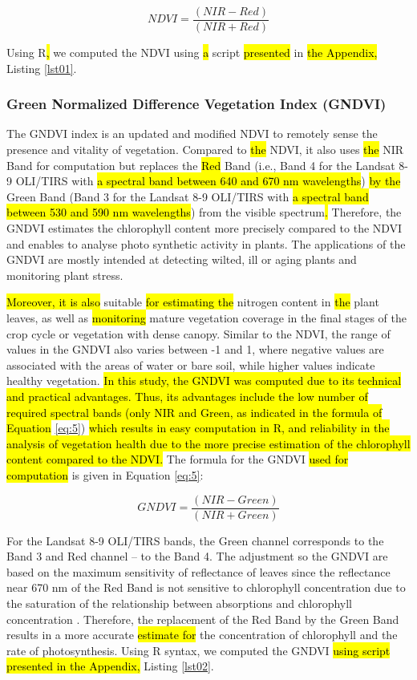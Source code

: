 \documentclass[jimaging,article,submit,pdftex,moreauthors]{Definitions/mdpi}
\begin{document}
\begin{equation}\label{eq:1}
NDVI=\dfrac{(NIR-Red)}{(NIR+Red)}
\end{equation}

Using R\hl{, }we computed the NDVI using \hl{a }script \hl{presented} in \hl{the Appendix, }Listing \ref{lst01}. 

\subsubsection{Green Normalized Difference Vegetation Index (GNDVI)}

The GNDVI index is an updated and modified NDVI to remotely sense the presence and vitality of vegetation. Compared to \hl{the }NDVI, it also uses \hl{the }NIR Band for computation but replaces the \hl{Red} Band (i.e., Band 4 for the Landsat 8-9 OLI/TIRS with \hl{a spectral band between 640 and 670 nm wavelengths}) \hl{by the }Green Band (Band 3 for the Landsat 8-9 OLI/TIRS with \hl{a spectral band between 530 and 590 nm wavelengths}) from the visible spectrum\hl{.} Therefore, the GNDVI estimates the chlorophyll content more precisely compared to the NDVI and enables to analyse photo synthetic activity in plants. The applications of the GNDVI are mostly intended at detecting wilted, ill or aging plants and monitoring plant stress. 

\hl{Moreover, it is also }suitable \hl{for estimating the }nitrogen content in \hl{the }plant leaves, as well as\hl{ monitoring} mature vegetation coverage in the final stages of the crop cycle\hl{ }or vegetation with dense canopy. Similar to the NDVI, the range of values in the GNDVI also varies between -1 and 1, where negative values are associated with the areas of water or bare soil, while higher values indicate healthy vegetation. \hl{In this study, the GNDVI was computed due to its technical and practical advantages. Thus, its advantages include the low number of required spectral bands (only NIR and Green, as indicated in the formula of Equation} \ref{eq:5}) \hl{which results in easy computation in R, and reliability in the analysis of vegetation health due to the more precise estimation of the chlorophyll content compared to the NDVI. }The formula for the GNDVI \hl{used for computation }is given in Equation \ref{eq:5}:

\begin{equation}\label{eq:5}
	GNDVI=\dfrac{(NIR-Green)}{(NIR+Green)}
\end{equation}

For the Landsat 8-9 OLI/TIRS bands, the Green channel corresponds to the Band 3 and Red channel -- to the Band 4. The adjustment so the GNDVI are based on the maximum sensitivity of reflectance of leaves since the reflectance near 670 nm of the Red Band is not sensitive to chlorophyll concentration due to the saturation of the relationship between absorptions and chlorophyll concentration \cite{GITELSON1996289}. Therefore, the replacement of the Red Band by the Green Band results in a more accurate \hl{estimate for} the concentration of chlorophyll and the rate of photosynthesis. Using R syntax, we computed the GNDVI \hl{using script presented in the Appendix, } Listing \ref{lst02}. 
\end{document}
